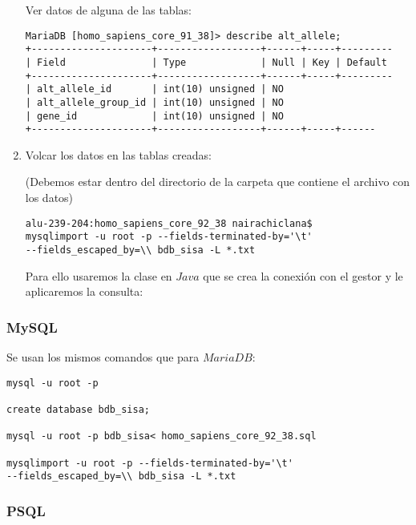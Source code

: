 \documentclass[12pt,a4paper]{article}
\begin{document}
\begin{enumerate}
\begin{verbatim}
\end{verbatim}

Ver datos de alguna de las tablas:
\begin{verbatim}
MariaDB [homo_sapiens_core_91_38]> describe alt_allele;
+---------------------+------------------+------+-----+---------
| Field               | Type             | Null | Key | Default 
+---------------------+------------------+------+-----+---------
| alt_allele_id       | int(10) unsigned | NO 
| alt_allele_group_id | int(10) unsigned | NO 
| gene_id             | int(10) unsigned | NO 
+---------------------+------------------+------+-----+------
\end{verbatim}

\item Volcar los datos en las tablas creadas:

(Debemos estar dentro del directorio de la carpeta que contiene el archivo con los datos)

\begin{verbatim}
alu-239-204:homo_sapiens_core_92_38 nairachiclana$ 
mysqlimport -u root -p --fields-terminated-by='\t' 
--fields_escaped_by=\\ bdb_sisa -L *.txt
\end{verbatim}

Para ello usaremos la clase en $Java$ que se crea la conexión con el gestor y le aplicaremos la consulta:



\end{enumerate}

\newpage
\subsubsection{MySQL} \label{pto212}
Se usan los mismos comandos que para $MariaDB:$

\begin{verbatim}
mysql -u root -p

create database bdb_sisa;

mysql -u root -p bdb_sisa< homo_sapiens_core_92_38.sql 

mysqlimport -u root -p --fields-terminated-by='\t'  
--fields_escaped_by=\\ bdb_sisa -L *.txt
\end{verbatim}

\subsubsection{PSQL} \label{pto213}
\end{document}
